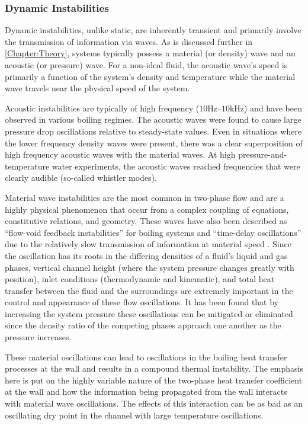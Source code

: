 \subsubsection{Dynamic Instabilities}
Dynamic instabilities, unlike static, are inherently transient and primarily involve the transmission of information via waves.
As is discussed further in \cref{Chapter:Theory}, \THs systems typically possess a material (or density) wave and an acoustic (or pressure) wave.
For a non-ideal fluid, the acoustic wave's speed is primarily a function of the system's density and temperature while the material wave travels near the physical speed of the system.

Acoustic instabilities are typically of high frequency ($10$Hz--$10$kHz) and have been observed in various boiling regimes.
The acoustic waves were found to cause large pressure drop oscillations relative to steady-state values.
Even in situations where the lower frequency density waves were present, there was a clear superposition of high frequency acoustic waves with the material waves.
At high pressure-and-temperature water experiments, the acoustic waves reached frequencies that were clearly audible (so-called whistler modes).

Material wave instabilities are the most common in two-phase flow and are a highly physical phenomenon that occur from a complex coupling of \THs equations, constitutive relations, and geometry.
These waves have also been described as ``flow-void feedback instabilities'' for boiling systems \cite{neal_mechanisms_1967} and ``time-delay oscillations'' due to the relatively slow transmission of information at material speed \cite{boure_oscillatory_1966}.
Since the oscillation has its roots in the differing densities of a fluid's liquid and gas phases, vertical channel height (where the system pressure changes greatly with position), inlet conditions (thermodynamic and kinematic), and total heat transfer between the fluid and the surroundings are extremely important in the control and appearance of these flow oscillations.
It has been found that by increasing the system pressure these oscillations can be mitigated or eliminated since the density ratio of the competing phases approach one another as the pressure increases.

These material oscillations can lead to oscillations in the boiling heat transfer processes at the wall and results in a compound thermal instability.
The emphasis here is put on the highly variable nature of the two-phase heat transfer coefficient at the wall and how the information being propagated from the wall interacts with material wave oscillations.
The effects of this interaction can be as bad as an oscillating dry point in the channel with large temperature oscillations.



